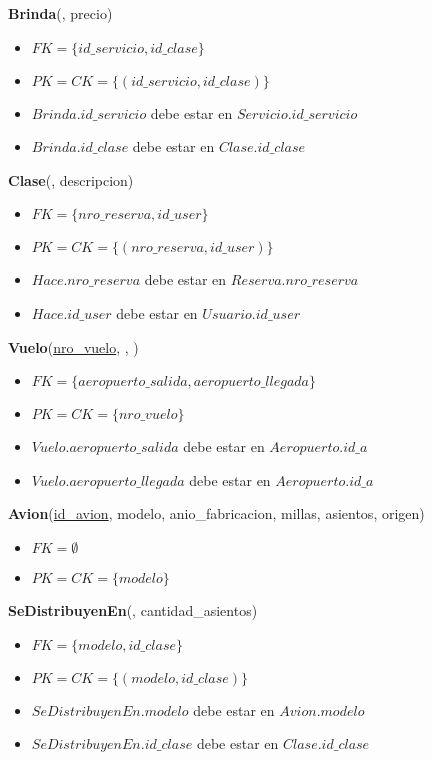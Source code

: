 \vspace*{0.1cm}
\noindent
\textbf{Brinda}(\underline{}, precio)
\begin{itemize}[noitemsep]
	\item $FK = \{id\_servicio, id\_clase\}$
	\item $PK = CK = \{(id\_servicio, id\_clase)\}$
	\item $Brinda.id\_servicio$ debe estar en $Servicio.id\_servicio$
	\item $Brinda.id\_clase$ debe estar en $Clase.id\_clase$
\end{itemize}

\vspace*{0.1cm}
\noindent
\textbf{Clase}(\underline{}, descripcion)
\begin{itemize}[noitemsep]
	\item $FK = \{nro\_reserva, id\_user\}$
	\item $PK = CK = \{(nro\_reserva, id\_user)\}$
	\item $Hace.nro\_reserva$ debe estar en $Reserva.nro\_reserva$
	\item $Hace.id\_user$ debe estar en $Usuario.id\_user$
\end{itemize}


\newpage
\vspace*{0.1cm}
\noindent
\textbf{Vuelo}(\underline{nro\_vuelo}, ,
		)
\begin{itemize}[noitemsep]
	\item $FK = \{aeropuerto\_salida, aeropuerto\_llegada\}$
	\item $PK = CK = \{nro\_vuelo\}$
	\item $Vuelo.aeropuerto\_salida$ debe estar en $Aeropuerto.id\_a$
	\item $Vuelo.aeropuerto\_llegada$ debe estar en $Aeropuerto.id\_a$
\end{itemize}

\vspace*{0.1cm}
\noindent
\textbf{Avion}(\underline{id\_avion}, modelo, anio\_fabricacion, 
    millas, asientos, origen)
\begin{itemize}[noitemsep]
	\item $FK = \emptyset$
	\item $PK = CK = \{modelo\}$
\end{itemize}

\vspace*{0.1cm}
\noindent
\textbf{SeDistribuyenEn}(\underline{},
	cantidad\_asientos)
\begin{itemize}[noitemsep]
	\item $FK = \{modelo, id\_clase\}$
	\item $PK = CK = \{(modelo, id\_clase)\}$
	\item $SeDistribuyenEn.modelo$ debe estar en $Avion.modelo$
	\item $SeDistribuyenEn.id\_clase$ debe estar en $Clase.id\_clase$
\end{itemize}

